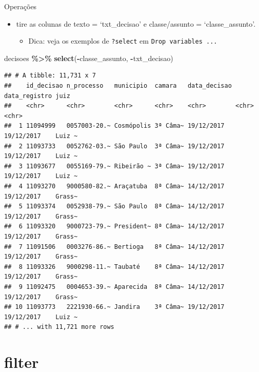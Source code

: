 \documentclass[
  10pt,
  ignorenonframetext,
]{beamer}
\newenvironment{Shaded}{\begin{snugshade}}{\end{snugshade}}
\newcommand{\KeywordTok}[1]{\textcolor[rgb]{0.13,0.29,0.53}{\textbf{#1}}}
\newcommand{\NormalTok}[1]{#1}
\newcommand{\OperatorTok}[1]{\textcolor[rgb]{0.81,0.36,0.00}{\textbf{#1}}}
\newcommand{\StringTok}[1]{\textcolor[rgb]{0.31,0.60,0.02}{#1}}
\providecommand{\tightlist}{%
  \setlength{\itemsep}{0pt}\setlength{\parskip}{0pt}}
\begin{document}
\begin{frame}[fragile]{Operações}
\protect\hypertarget{operauxe7uxf5es-1}{}
\begin{itemize}
\tightlist
\item
  tire as colunas de texto = `txt\_decisao' e classe/assunto =
  `classe\_assunto'.

  \begin{itemize}
  \tightlist
  \item
    Dica: veja os exemplos de \texttt{?select} em
    \texttt{Drop\ variables\ ...}
  \end{itemize}
\end{itemize}

\begin{Shaded}
\begin{Highlighting}[]
\NormalTok{decisoes }\OperatorTok{\%\textgreater{}\%}\StringTok{ }
\StringTok{  }\KeywordTok{select}\NormalTok{(}\OperatorTok{{-}}\NormalTok{classe\_assunto, }\OperatorTok{{-}}\NormalTok{txt\_decisao)}
\end{Highlighting}
\end{Shaded}

\begin{verbatim}
## # A tibble: 11,731 x 7
##    id_decisao n_processo   municipio  camara   data_decisao data_registro juiz  
##    <chr>      <chr>        <chr>      <chr>    <chr>        <chr>         <chr> 
##  1 11094999   0057003-20.~ Cosmópolis 3ª Câma~ 19/12/2017   19/12/2017    Luiz ~
##  2 11093733   0052762-03.~ São Paulo  3ª Câma~ 19/12/2017   19/12/2017    Luiz ~
##  3 11093677   0055169-79.~ Ribeirão ~ 3ª Câma~ 19/12/2017   19/12/2017    Luiz ~
##  4 11093270   9000580-82.~ Araçatuba  8ª Câma~ 14/12/2017   19/12/2017    Grass~
##  5 11093374   0052938-79.~ São Paulo  8ª Câma~ 14/12/2017   19/12/2017    Grass~
##  6 11093320   9000723-79.~ President~ 8ª Câma~ 14/12/2017   19/12/2017    Grass~
##  7 11091506   0003276-86.~ Bertioga   8ª Câma~ 14/12/2017   19/12/2017    Grass~
##  8 11093326   9000298-11.~ Taubaté    8ª Câma~ 14/12/2017   19/12/2017    Grass~
##  9 11092475   0004653-39.~ Aparecida  8ª Câma~ 14/12/2017   19/12/2017    Grass~
## 10 11093773   2221930-66.~ Jandira    3ª Câma~ 19/12/2017   19/12/2017    Luiz ~
## # ... with 11,721 more rows
\end{verbatim}
\end{frame}

\hypertarget{filter}{%
\section{filter}\label{filter}}
\end{document}

